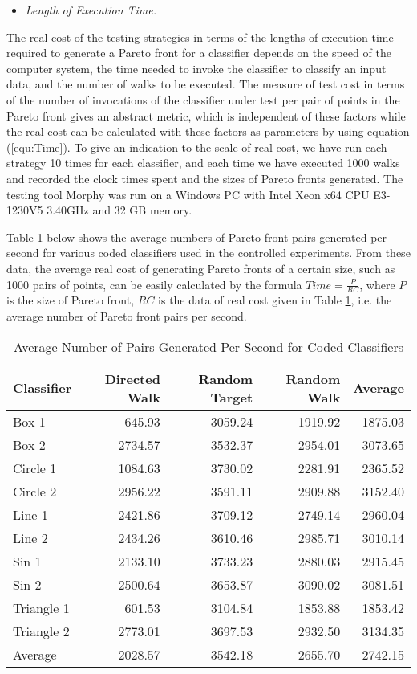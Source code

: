 \documentclass[preprint,1p,authoryear,times]{elsarticle}
\begin{document}
\begin{itemize}
\item \emph{Length of Execution Time.}
\end{itemize}

The real cost of the testing strategies in terms of the lengths of execution time required to generate a Pareto front for a classifier depends on the speed of the computer system, the time needed to invoke the classifier to classify an input data, and the number of walks to be executed. The measure of test cost in terms of the number of invocations of the classifier under test per pair of points in the Pareto front gives an abstract metric, which is independent of these factors while the real cost can be calculated with these factors as parameters by using equation (\ref{equ:Time}). To give an indication to the scale of real cost, we have run each strategy 10 times for each classifier, and each time we have executed 1000 walks and recorded the clock times spent and the sizes of Pareto fronts generated. The testing tool Morphy was run on a Windows PC with Intel Xeon x64 CPU E3-1230V5 \@ 3.40GHz and 32 GB memory. 

Table \ref{tab:TimeOfCodedClassifiers} below shows the average numbers of Pareto front pairs generated per second for various coded classifiers used in the controlled experiments. From these data, the average real cost of generating Pareto fronts of a certain size, such as 1000 pairs of points, can be easily calculated by the formula $Time = \frac{P}{RC}$, where $P$ is the size of Pareto front, $RC$ is the data of real cost given in Table \ref{tab:TimeOfCodedClassifiers}, i.e. the average number of Pareto front pairs per second. 

\begin{table}[h]
\centering
\caption{Average Number of Pairs Generated Per Second for Coded Classifiers}\label{tab:TimeOfCodedClassifiers}
\scriptsize
\begin{tabular}{|l|r|r|r|r|}
\hline 
Classifier &Directed Walk &Random Target &Random Walk	 &Average\\
\hline
Box 1 &645.93 &3059.24& 1919.92 &1875.03\\
Box 2 &2734.57 &3532.37 &2954.01 &3073.65\\
Circle 1 &1084.63 &3730.02 &2281.91 &2365.52\\
Circle 2	 &2956.22 &3591.11 &2909.88 &3152.40\\
Line 1 &2421.86 &3709.12 &2749.14 &2960.04\\
Line 2 &2434.26 &3610.46 &2985.71 &3010.14\\
Sin 1 &2133.10 &3733.23 &2880.03 &2915.45\\
Sin 2 &2500.64 &3653.87 &3090.02 &3081.51\\
Triangle 1 &601.53 &3104.84 &1853.88 &1853.42\\
Triangle 2 &2773.01 &3697.53 &2932.50 &3134.35\\
\hline
Average &2028.57 &3542.18 &2655.70 &2742.15\\
\hline 
\end{tabular} 
\end{table}
\end{document}
